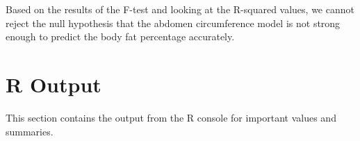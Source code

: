 \documentclass[a4paper, 11pt]{article}
\begin{document}
Based on the results of the F-test and looking at the R-squared values, we cannot reject the  null hypothesis that the abdomen circumference model is not strong enough to predict the body fat percentage accurately.


\section*{R Output}
This section contains the output from the R console for important values and summaries.

\end{document}
